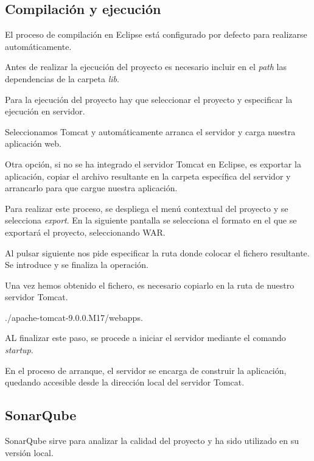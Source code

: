 \subsection{Compilación y ejecución}

El proceso de compilación en Eclipse está configurado por defecto para realizarse automáticamente.

Antes de realizar la ejecución del proyecto es necesario incluir en el \emph{path} las dependencias de la carpeta \emph{lib}.

Para la ejecución del proyecto hay que seleccionar el proyecto y especificar la ejecución en servidor.


Seleccionamos Tomcat y automáticamente arranca el servidor y carga nuestra aplicación web.

Otra opción, si no se ha integrado el servidor Tomcat en Eclipse, es exportar la aplicación, copiar el archivo resultante en la carpeta específica del servidor y arrancarlo para que cargue nuestra aplicación.

Para realizar este proceso, se despliega el menú contextual del proyecto y se selecciona \emph{export}. En la siguiente pantalla se selecciona el formato en el que se exportará el proyecto, seleccionando WAR.


Al pulsar siguiente nos pide especificar la ruta donde colocar el fichero resultante. Se introduce y se finaliza la operación.


Una vez hemos obtenido el fichero, es necesario copiarlo en la ruta de nuestro servidor Tomcat.

./apache-tomcat-9.0.0.M17/webapps.

AL finalizar este paso, se procede a iniciar el servidor mediante el comando \emph{startup}.


En el proceso de arranque, el servidor se encarga de construir la aplicación, quedando accesible desde la dirección local del servidor Tomcat.

\subsection{SonarQube}

SonarQube sirve para analizar la calidad del proyecto y ha sido utilizado en su versión local.


